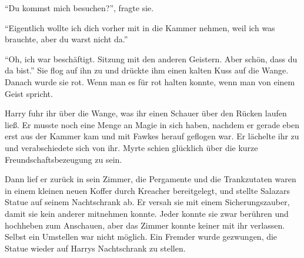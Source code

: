 \enquote{Du kommst mich besuchen?}, fragte sie.

\enquote{Eigentlich wollte ich dich vorher mit in die Kammer nehmen, weil ich was brauchte, aber du warst nicht da.}

\enquote{Oh, ich war beschäftigt. Sitzung mit den anderen Geistern. Aber schön, dass du da bist.} Sie flog auf ihn zu und drückte ihm einen kalten Kuss auf die Wange. Danach wurde sie rot. Wenn man es für rot halten konnte, wenn man von einem Geist spricht.

Harry fuhr ihr über die Wange, was ihr einen Schauer über den Rücken laufen ließ. Er musste noch eine Menge an Magie in sich haben, nachdem er gerade eben erst aus der Kammer kam und mit Fawkes herauf geflogen war. Er lächelte ihr zu und verabschiedete sich von ihr. Myrte schien glücklich über die kurze Freundschaftsbezeugung zu sein.

Dann lief er zurück in sein Zimmer, die Pergamente und die Trankzutaten waren in einem kleinen neuen Koffer durch Kreacher bereitgelegt, und stellte Salazars Statue auf seinem Nachtschrank ab. Er versah sie mit einem Sicherungszauber, damit sie kein anderer mitnehmen konnte. Jeder konnte sie zwar berühren und hochheben zum Anschauen, aber das Zimmer konnte keiner mit ihr verlassen. Selbst ein Umstellen war nicht möglich. Ein Fremder wurde gezwungen, die Statue wieder auf Harrys Nachtschrank zu stellen.

\trenn
\onelineback %

